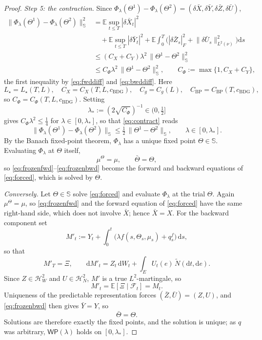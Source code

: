 \documentclass[preprint,12pt]{elsarticle}
\newcommand{\E}{\mathbb{E}}
\newcommand{\F}{\mathcal{F}}
\newcommand{\diff}{\mathrm{d}}
\newcommand{\Nt}{\widetilde{N}}
\newcommand{\Lnu}{L^2(\nu)}
\newcommand{\HH}{\mathbb{S}}
\newcommand{\HW}{\mathcal{H}^2_W}
\newcommand{\HN}{\mathcal{H}^2_N}
\newcommand{\Lnorm}[1]{\lVert #1\rVert_{\Lnu}}
\numberwithin{equation}{section}
\theoremstyle{plain}
\theoremstyle{definition}
\theoremstyle{\PaperRemarkStyle}
\begin{document}
\begin{proof}
\emph{Step 5: the contraction.} Since
$\Phi_\lambda(\Theta^1)-\Phi_\lambda(\Theta^2)
=(\delta\bar X,\delta\bar Y,\delta\bar Z,\delta\bar U)$,
\begin{equation}\label{eq:contract}
\begin{aligned}
\|\Phi_\lambda(\Theta^1)-\Phi_\lambda(\Theta^2)\|_{\HH}^2
&=\E\sup_{t\le T}|\delta\bar X_t|^2\\
&\quad+\E\sup_{t\le T}|\delta\bar Y_t|^2
+\E\!\int_0^T\!\big(|\delta\bar Z_s|_F^2+\Lnorm{\delta\bar U_s}^2\big)\diff s\\
&\le(C_X+C_Y)\lambda^2\,\|\Theta^1-\Theta^2\|_{\HH}^2\\
&\le C_\Phi\lambda^2\,\|\Theta^1-\Theta^2\|_{\HH}^2 ,
\qquad C_\Phi:=\max\{1,C_X+C_Y\} ,
\end{aligned}
\end{equation}
the first inequality by \eqref{eq:fwddiff} and \eqref{eq:bwddiff}. Here
\[
L_\star=L_\star(T,L),\quad C_X=C_X(T,L,c_{\mathrm{BDG}}),\quad
C_g=C_g(L),\quad C_{\mathrm{BP}}=C_{\mathrm{BP}}(T,c_{\mathrm{BDG}}),
\]
so $C_\Phi=C_\Phi(T,L,c_{\mathrm{BDG}})$. Setting
\[
\lambda_*:=(2\sqrt{C_\Phi})^{-1}\in(0,\tfrac12]
\]
gives $C_\Phi\lambda^2\le\tfrac14$ for $\lambda\in[0,\lambda_*]$, so that \eqref{eq:contract}
reads
\[
\|\Phi_\lambda(\Theta^1)-\Phi_\lambda(\Theta^2)\|_{\HH}
\le\tfrac12\,\|\Theta^1-\Theta^2\|_{\HH},\qquad\lambda\in[0,\lambda_*] .
\]
By the Banach fixed-point theorem, $\Phi_\lambda$ has a unique fixed point $\Theta\in\HH$.
Evaluating $\Phi_\lambda$ at $\Theta$ itself,
\[
\mu^\Theta=\mu,\qquad\bar\Theta=\Theta ,
\]
so \eqref{eq:frozenfwd}--\eqref{eq:frozenbwd} become the forward and backward equations of
\eqref{eq:forced}, which is solved by $\Theta$.

\emph{Conversely.} Let $\Theta\in\HH$ solve \eqref{eq:forced} and evaluate $\Phi_\lambda$
at the trial $\Theta$. Again $\mu^\Theta=\mu$, so \eqref{eq:frozenfwd} and the forward
equation of \eqref{eq:forced} have the same right-hand side, which does not involve
$\bar X$; hence $\bar X=X$. For the backward component set
\[
M'_t:=Y_t+\int_0^t\!\big(\lambda f(s,\Theta_s,\mu_s)+q^f_s\big)\,\diff s ,
\]
so that
\[
M'_T=\Xi,\qquad
\diff M'_t=Z_t\,\diff W_t+\int_E U_t(e)\,\Nt(\diff t,\diff e) .
\]
Since $Z\in\HW$ and $U\in\HN$, $M'$ is a true $L^2$-martingale, so
\[
M'_t=\E[\Xi\mid\F_t]=M_t .
\]
Uniqueness of the predictable representation forces $(\bar Z,\bar U)=(Z,U)$, and
\eqref{eq:frozenbwd} then gives $\bar Y=Y$, so
\[
\bar\Theta=\Theta .
\]
Solutions are therefore exactly the fixed points, and the solution is unique; as $q$ was
arbitrary, $\mathsf{WP}(\lambda)$ holds on $[0,\lambda_*]$.
\end{proof}
\end{document}
